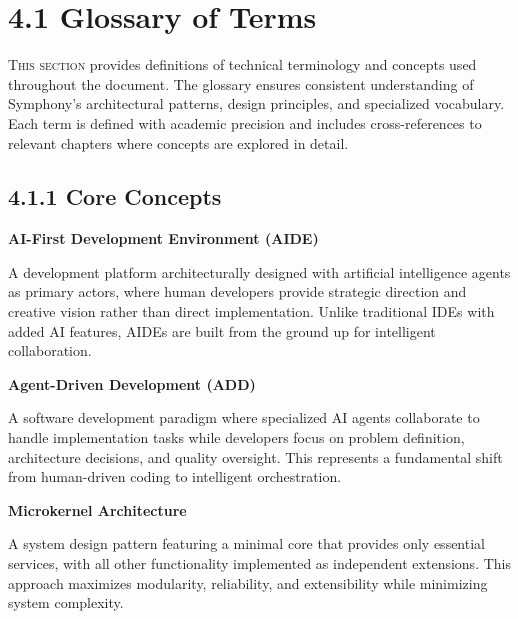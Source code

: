 
\section{4.1 Glossary of Terms}
\label{sec:glossary}
\setcounter{subsection}{0}

\lettrine{T}{his section} provides definitions of technical terminology and concepts used throughout the document. The glossary ensures consistent understanding of Symphony's architectural patterns, design principles, and specialized vocabulary. Each term is defined with academic precision and includes cross-references to relevant chapters where concepts are explored in detail.

\subsection*{4.1.1 Core Concepts}

\vspace{0.3cm}

\noindent\textbf{AI-First Development Environment (AIDE)}

A development platform architecturally designed with artificial intelligence agents as primary actors, where human developers provide strategic direction and creative vision rather than direct implementation. Unlike traditional IDEs with added AI features, AIDEs are built from the ground up for intelligent collaboration.

\vspace{0.3cm}

\noindent\textbf{Agent-Driven Development (ADD)}

A software development paradigm where specialized AI agents collaborate to handle implementation tasks while developers focus on problem definition, architecture decisions, and quality oversight. This represents a fundamental shift from human-driven coding to intelligent orchestration.

\vspace{0.3cm}

\noindent\textbf{Microkernel Architecture}

A system design pattern featuring a minimal core that provides only essential services, with all other functionality implemented as independent extensions. This approach maximizes modularity, reliability, and extensibility while minimizing system complexity.

